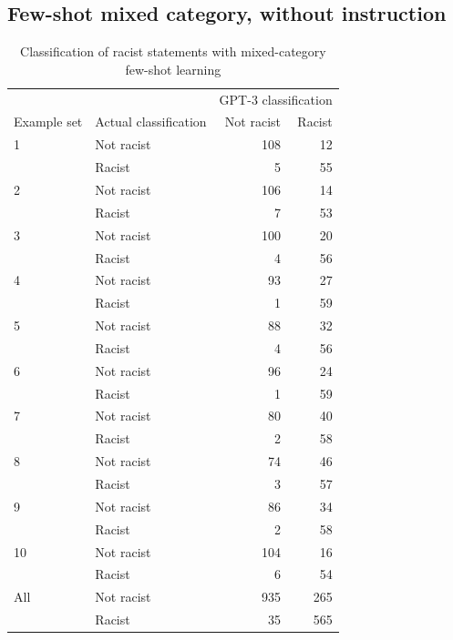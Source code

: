 \documentclass[12pt,]{article}
\begin{document}
\hypertarget{appendxbmuxedubsnorinstruction}{%
\subsection{Few-shot mixed category, without instruction}\label{appendxbmuxedubsnorinstruction}}

\begin{table}[!h]

\caption{\label{tab:fewshotmixed-racism}Classification of racist statements with mixed-category few-shot learning}
\centering
\fontsize{8}{10}\selectfont
\begin{tabular}[t]{llrr}
\toprule
\multicolumn{2}{c}{ } & \multicolumn{2}{c}{GPT-3 classification} \\
\cmidrule(l{3pt}r{3pt}){3-4}
Example set & Actual classification & Not racist & Racist\\
\midrule
1 & Not racist & 108 & 12\\
 & Racist & 5 & 55\\
\midrule
2 & Not racist & 106 & 14\\
 & Racist & 7 & 53\\
\midrule
3 & Not racist & 100 & 20\\
 & Racist & 4 & \vphantom{1} 56\\
\midrule
4 & Not racist & 93 & 27\\
 & Racist & 1 & \vphantom{1} 59\\
\midrule
5 & Not racist & 88 & 32\\
 & Racist & 4 & 56\\
\midrule
6 & Not racist & 96 & 24\\
 & Racist & 1 & 59\\
\midrule
7 & Not racist & 80 & 40\\
 & Racist & 2 & \vphantom{1} 58\\
\midrule
8 & Not racist & 74 & 46\\
 & Racist & 3 & 57\\
\midrule
9 & Not racist & 86 & 34\\
 & Racist & 2 & 58\\
\midrule
10 & Not racist & 104 & 16\\
 & Racist & 6 & 54\\
\midrule
All & Not racist & 935 & 265\\
 & Racist & 35 & 565\\
\bottomrule
\end{tabular}
\end{table}
\end{document}
